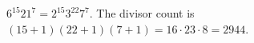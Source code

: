 $6^{15}21^7=2^{15}3^{22}7^7$. The divisor count is $(15+1)(22+1)(7+1)=16\cdot23\cdot8=\boxed{2944}$.
